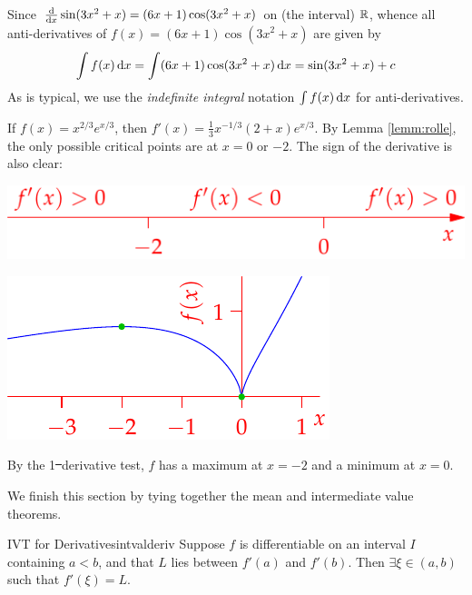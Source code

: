 \begin{examples}{}{}
\exstart Since $\frac{\mathrm{d} }{\mathrm{d} x}\sin(3x^2+x)=(6x+1)\cos(3x^2+x)$ on (the interval) $\mathbb{R}$, whence all anti-derivatives of $f(x)=(6x+1)\cos(3x^2+x)$ are given by
	\[\int f(x)\,{\mathrm{d} x}=\int (6x+1)\cos(3x^2+x)\,{\mathrm{d} x}=\sin(3x^2+x)+c\]
	As is typical, we use the \emph{indefinite integral} notation $\int f(x)\,{\mathrm{d} x}$ for anti-derivatives.
\begin{enumerate}\setcounter{enumi}{1}
  \begin{minipage}[t]{0.6\linewidth}\vspace{0pt}
  	\item If $f(x)=x^{2/3}e^{x/3}$, then $f'(x)=\frac 13x^{-1/3}(2+x)e^{x/3}$.\smallbreak
  	By Lemma \ref{lemm:rolle}, the only possible critical points are at $x=0$ or $-2$. The sign of the derivative is also clear:
  	\begin{center}
  	\includegraphics[scale=0.9]{mvt-ex3}
  	\end{center}
  \end{minipage}\begin{minipage}[t]{0.4\linewidth}\vspace{0pt}
  \flushright\includegraphics{mvt-ex2}
  \end{minipage}\smallbreak	
	By the 1\st\ derivative test, $f$ has a maximum at $x=-2$ and a minimum at $x=0$.
\end{enumerate}
\end{examples}

We finish this section by tying together the mean and intermediate value theorems.

\begin{thm}{IVT for Derivatives}{intvalderiv}
Suppose $f$ is differentiable on an interval $I$ containing $a<b$, and that $L$ lies between $f'(a)$ and $f'(b)$. Then $\exists\xi\in(a,b)$ such that $f'(\xi)=L$.
\end{thm}

